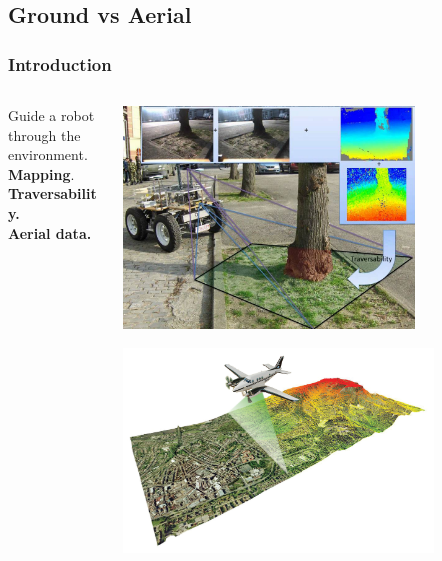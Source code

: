 \documentclass[usenames,dvipsnames,10pt]{beamer}
\begin{document}
\subsection{Ground vs Aerial}
\begin{frame}
\frametitle{Introduction}
\begin{columns}
	\begin{column}{0.55\textwidth}
		\hspace{0.5cm} Guide a robot through the environment. \\[0.1cm]
		\hspace{1.2cm} \textbf{Mapping}. \\
		\hspace{1.2cm} \textbf{Traversability.} \\
		\hspace{1.2cm} \textbf{Aerial data.} \\
		\hspace{1.2cm} \phantom{Localization.} \\
	\end{column}
	\begin{column}{0.5\textwidth}
		\begin{center}
			\includegraphics[width=0.75\textwidth]{graphics/trav-from-ground} \\
			\tiny{}
		\end{center}
		\begin{center}
			\includegraphics[width=0.8\textwidth]{graphics/lidar_data} \\
			\tiny{}
		\end{center}
	\end{column}
\end{columns}
\end{frame}
\end{document}

